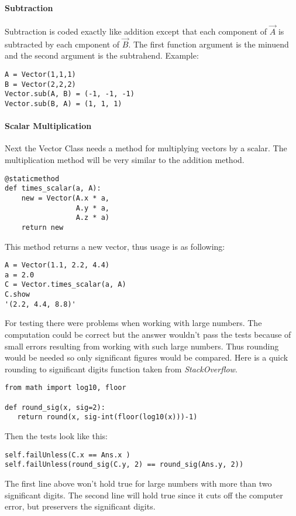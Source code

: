 \documentclass[15pt]{report}
\begin{document}
\paragraph{Subtraction}Subtraction is coded exactly like addition except that each component of $\vec{A}$ is subtracted by each cmponent of $\vec{B}$. The first function argument is the minuend and the second argument is the subtrahend. Example:
\begin{lstlisting}
A = Vector(1,1,1)
B = Vector(2,2,2)
Vector.sub(A, B) = (-1, -1, -1)
Vector.sub(B, A) = (1, 1, 1)
\end{lstlisting}

\paragraph{Scalar Multiplication} Next the Vector Class needs a method for multiplying vectors by a scalar. The multiplication method will be very similar to the addition method.

\begin{lstlisting}
@staticmethod
def times_scalar(a, A):
    new = Vector(A.x * a, 
                 A.y * a,
                 A.z * a)
    return new
\end{lstlisting}
This method returns a new vector, thus usage is as following:
\begin{lstlisting}
A = Vector(1.1, 2.2, 4.4)
a = 2.0
C = Vector.times_scalar(a, A)
C.show
'(2.2, 4.4, 8.8)'
\end{lstlisting}
For testing there were problems when working with large numbers. The computation could be correct but the answer wouldn't pass the tests because of small errors resulting from working with such large numbers. Thus rounding would be needed so only significant figures would be compared. Here is a quick rounding to significant digits function taken from \textit{StackOverflow}\cite{indgar}.
\newpage
\begin{lstlisting}
from math import log10, floor

def round_sig(x, sig=2):
   return round(x, sig-int(floor(log10(x)))-1)
\end{lstlisting}
Then the tests look like this:
\begin{lstlisting}
self.failUnless(C.x == Ans.x )            
self.failUnless(round_sig(C.y, 2) == round_sig(Ans.y, 2))
\end{lstlisting}
The first line above won't hold true for large numbers with more than two significant digits. The second line will hold true since it cuts off the computer error, but preservers the significant digits.
\end{document}
